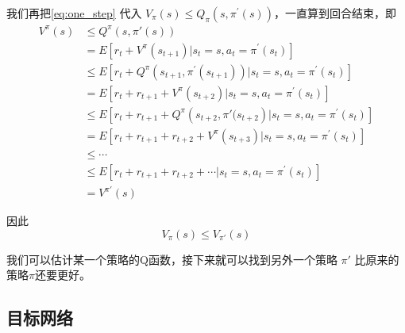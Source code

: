 我们再把\eqref{eq:one_step} 代入 $V_{\pi}(s) \leqslant Q_{\pi}\left(s, \pi^{\prime}(s)\right)$，一直算到回合结束，即
\begin{equation}
    \label{eq:}
    \begin{aligned}
        V^{\pi}(s) &\le Q^{\pi}(s,\pi'(s)) \\
        &=E\left[r_{t}+V^{\pi}\left(s_{t+1}\right) | s_{t}=s, a_{t}=\pi^{\prime}\left(s_{t}\right)\right]\\
        &\le E\left[r_{t}+Q^{\pi}\left(s_{t+1}, \pi^{\prime}\left(s_{t+1}\right)\right) | s_{t}=s, a_{t}=\pi^{\prime}\left(s_{t}\right)\right] \\
        &=E\left[r_{t}+r_{t+1}+V^{\pi}\left(s_{t+2}\right) |s_{t}=s, a_{t}=\pi^{\prime}\left(s_{t}\right)\right]  \\
        & \le E\left[r_{t}+r_{t+1}+Q^{\pi}\left(s_{t+2},\pi'(s_{t+2}\right) | s_{t}=s, a_{t}=\pi^{\prime}\left(s_{t}\right)\right] \\
        & = E\left[r_{t}+r_{t+1}+r_{t+2}+V^{\pi}\left(s_{t+3}\right) |s_{t}=s, a_{t}=\pi^{\prime}\left(s_{t}\right)\right] \\
        & \le \cdots\\
        & \le E\left[r_{t}+r_{t+1}+r_{t+2}+\cdots | s_{t}=s, a_{t}=\pi^{\prime}\left(s_{t}\right)\right]  \\
        & = V^{\pi'}(s)
        \end{aligned}
\end{equation}


因此
\begin{equation}
    \label{eq:}
    V_{\pi}(s)\leqslant V_{\pi'}(s)
\end{equation}

我们可以估计某一个策略的Q函数，接下来就可以找到另外一个策略 $\pi'$ 比原来的策略$\pi$还要更好。

\subsection{目标网络} 

